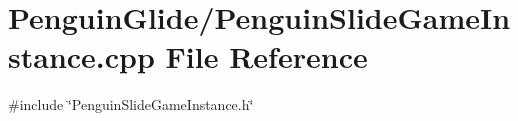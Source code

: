 \section{Penguin\+Glide/\+Penguin\+Slide\+Game\+Instance.cpp File Reference}
\label{_penguin_slide_game_instance_8cpp}
{\ttfamily \#include \char`\"{}Penguin\+Slide\+Game\+Instance.\+h\char`\"{}}\newline
